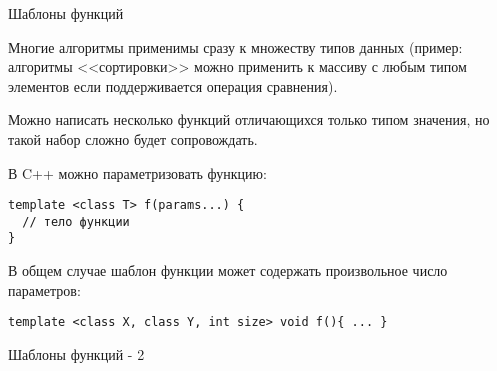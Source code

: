 \begin{frame}[t,fragile]{Шаблоны функций}

Многие алгоритмы применимы сразу к множеству типов данных 
(пример: алгоритмы <<сортировки>> можно применить к массиву с любым типом элементов если поддерживается операция сравнения). 

Можно написать несколько функций отличающихся только типом значения, но такой набор сложно будет сопровождать.

В C++ можно параметризовать функцию:
\begin{lstlisting}
template <class T> f(params...) {
  // тело функции
} 
\end{lstlisting}
В общем случае шаблон функции может содержать произвольное число параметров:
\begin{lstlisting}
template <class X, class Y, int size> void f(){ ... } 
\end{lstlisting}

\end{frame}

\begin{frame}[t,fragile]{Шаблоны функций - 2}


\end{frame}



